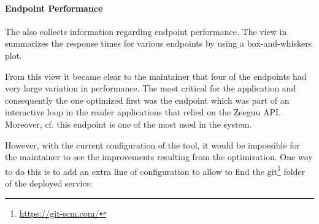 \documentclass{sig-alternate-05-2015}
\begin{document}
\paragraph{Endpoint Performance}
\label{sec:perf}

  The \tool also collects information regarding endpoint performance. The view in  summarizes the response times for various endpoints by using a box-and-whiskers plot. 



  From this view it became clear to the maintainer that four of the endpoints had very large variation in performance.   The most critical for the application and consequently the one optimized first was the \epTranslations endpoint which was part of an interactive loop in the reader applications that relied on the Zeeguu API. Moreover, cf.  this endpoint is one of the most used in the system.


  \niceseparator


  However, with the current configuration of the tool, it would be impossible for the maintainer to see the improvements resulting from the optimization. One way to do this is to add an extra line of configuration to allow \tool to find the git\footnote{\url{https://git-scm.com/}} folder of the deployed service: 

%
%
%
    
\end{document}
